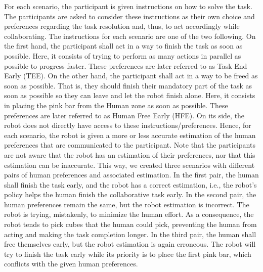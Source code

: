For each scenario, the participant is given instructions on how to solve the task. The participants are asked to consider these instructions as their own choice and preferences regarding the task resolution and, thus, to act accordingly while collaborating. The instructions for each scenario are one of the two following.
On the first hand, the participant shall act in a way to finish the task as soon as possible. Here, it consists of trying to perform as many actions in parallel as possible to progress faster. These preferences are later referred to as Task End Early (TEE).
On the other hand, the participant shall act in a way to be freed as soon as possible. That is, they should finish their mandatory part of the task as soon as possible so they can leave and let the robot finish alone. Here, it consists in placing the pink bar from the Human zone as soon as possible. These preferences are later referred to as Human Free Early (HFE).
On its side, the robot does not directly have access to these instructions/preferences. Hence, for each scenario, the robot is given a more or less accurate estimation of the human preferences that are communicated to the participant. Note that the participants are not aware that the robot has an estimation of their preferences, nor that this estimation can be inaccurate.
This way, we created three scenarios with different pairs of human preferences and associated estimation. In the first pair, the human shall finish the task early, and the robot has a correct estimation, i.e., the robot's policy helps the human finish the collaborative task early. In the second pair, the human preferences remain the same, but the robot estimation is incorrect. The robot is trying, mistakenly, to minimize the human effort. As a consequence, the robot tends to pick cubes that the human could pick, preventing the human from acting and making the task completion longer. In the third pair, the human shall free themselves early, but the robot estimation is again erroneous. The robot will try to finish the task early while its priority is to place the first pink bar, which conflicts with the given human preferences.

